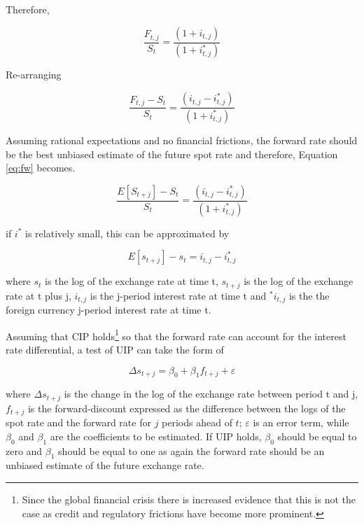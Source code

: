 \documentclass[12pt, a4paper, oneside]{article}\usepackage[]{graphicx}\usepackage[]{color}
\begin{document}
Therefore, 

\begin{equation}
\frac{F_{t,j}}{S_t} = \frac{(1 + i_{t, j})}{(1 + i_{t, j}^*)} 
\end{equation}

 Re-arranging

\begin{equation}
\label{eq:fw}
\frac{F_{t,j} - S_t}{S_t} = \frac{(i_{t,j} - i_{t,j}^*)}{(1 + i_{t,j}^*)} 
 \end{equation}

Assuming rational expectations and no financial frictions, the forward rate should be the best unbiased estimate of the future spot rate and therefore, Equation \ref{eq:fw} becomes.  

\begin{equation}
\frac{E[S_{t+j}] - S_t}{S_t} = \frac{(i_{t, j} - i_{t, j}^*)}{(1 + i_{t, j}^*)}
\label{eq:UIP1}
\end{equation} 

if $i^*$ is relatively small, this can be approximated by 

\begin{equation}
E[s_{t+j}] - s_t = i_{t,j} - i_{t,j}^* 
\end{equation} 

where $s_t$ is the log of the exchange rate at time t, $s_{t + j}$ is the log of the exchange rate at t plus j, $i_{t, j}$ is the j-period interest rate at time t and $^*i_{t, j}$ is the the foreign currency j-period interest rate at time t.  

Assuming that CIP holds\footnote{Since the global financial crisis there is increased evidence that this is not the case as credit and regulatory frictions have become more prominent.} so that the forward rate can account for the interest rate differential, a test of UIP can take the form of 

\begin{equation}
\label{eq:uip2}
\Delta s_{t + j} = \beta_0 +\beta_1 f_{t+j} + \varepsilon
\end{equation} 

where $\Delta s_{t + j}$ is the change in the log of the exchange rate between period t and j, $f_{t+j}$ is the forward-discount expressed as the difference between the logs of the spot rate and the forward rate for $j$ periods ahead of $t$; $\varepsilon$ is an error term, while $\beta_0$ and $\beta_1$ are the coefficients to be estimated.  If UIP holds, $\beta_0$ should be equal to zero and $\beta_1$ should be equal to one as again the forward rate should be an unbiased estimate of the future exchange rate.   
\end{document}
